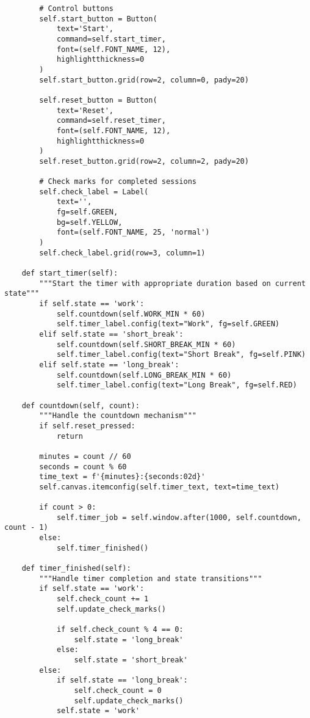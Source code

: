 \documentclass[12pt,a4paper]{article}
\begin{document}
\begin{tcolorbox}[colback=gray!5!white,colframe=gray!75!black,title=Complete Professional Pomodoro Timer]
\begin{lstlisting}
        # Control buttons
        self.start_button = Button(
            text='Start', 
            command=self.start_timer,
            font=(self.FONT_NAME, 12),
            highlightthickness=0
        )
        self.start_button.grid(row=2, column=0, pady=20)
        
        self.reset_button = Button(
            text='Reset', 
            command=self.reset_timer,
            font=(self.FONT_NAME, 12),
            highlightthickness=0
        )
        self.reset_button.grid(row=2, column=2, pady=20)
        
        # Check marks for completed sessions
        self.check_label = Label(
            text='', 
            fg=self.GREEN, 
            bg=self.YELLOW, 
            font=(self.FONT_NAME, 25, 'normal')
        )
        self.check_label.grid(row=3, column=1)
    
    def start_timer(self):
        """Start the timer with appropriate duration based on current state"""
        if self.state == 'work':
            self.countdown(self.WORK_MIN * 60)
            self.timer_label.config(text="Work", fg=self.GREEN)
        elif self.state == 'short_break':
            self.countdown(self.SHORT_BREAK_MIN * 60)
            self.timer_label.config(text="Short Break", fg=self.PINK)
        elif self.state == 'long_break':
            self.countdown(self.LONG_BREAK_MIN * 60)
            self.timer_label.config(text="Long Break", fg=self.RED)
    
    def countdown(self, count):
        """Handle the countdown mechanism"""
        if self.reset_pressed:
            return
            
        minutes = count // 60
        seconds = count % 60
        time_text = f'{minutes}:{seconds:02d}'
        self.canvas.itemconfig(self.timer_text, text=time_text)
        
        if count > 0:
            self.timer_job = self.window.after(1000, self.countdown, count - 1)
        else:
            self.timer_finished()
    
    def timer_finished(self):
        """Handle timer completion and state transitions"""
        if self.state == 'work':
            self.check_count += 1
            self.update_check_marks()
            
            if self.check_count % 4 == 0:
                self.state = 'long_break'
            else:
                self.state = 'short_break'
        else:
            if self.state == 'long_break':
                self.check_count = 0
                self.update_check_marks()
            self.state = 'work'
        

\end{lstlisting}
\end{tcolorbox}
\end{document}
